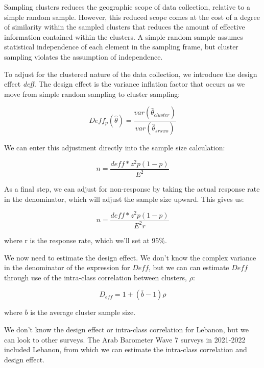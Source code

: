\documentclass[
  letterpaper,
  DIV=11,
  numbers=noendperiod]{scrreprt}
\newenvironment{Shaded}{\begin{snugshade}}{\end{snugshade}}
\newcommand{\CommentTok}[1]{\textcolor[rgb]{0.37,0.37,0.37}{#1}}
\newcommand{\FunctionTok}[1]{\textcolor[rgb]{0.28,0.35,0.67}{#1}}
\newcommand{\NormalTok}[1]{\textcolor[rgb]{0.00,0.23,0.31}{#1}}
\newcommand{\OtherTok}[1]{\textcolor[rgb]{0.00,0.23,0.31}{#1}}
\newcommand{\SpecialCharTok}[1]{\textcolor[rgb]{0.37,0.37,0.37}{#1}}
\begin{document}
Sampling clusters reduces the geographic scope of data collection,
relative to a simple random sample. However, this reduced scope comes at
the cost of a degree of similarity within the sampled clusters that
reduces the amount of effective information contained within the
clusters. A simple random sample assumes statistical independence of
each element in the sampling frame, but cluster sampling violates the
assumption of independence.

To adjust for the clustered nature of the data collection, we introduce
the design effect \emph{deff}. The design effect is the variance
inflation factor that occurs as we move from simple random sampling to
cluster sampling:

\[
Deff_p(\hat\theta)=\frac{var(\hat\theta_{cluster})}{var(\hat\theta_{srswo})}
\]

We can enter this adjustment directly into the sample size calculation:

\[
n=\frac{deff*z^2p(1-p)}{E^2}
\]

As a final step, we can adjust for non-response by taking the actual
response rate in the denominator, which will adjust the sample size
upward. This gives us:

\[
n=\frac{deff*z^2p(1-p)}{E^2r}
\]

where r is the response rate, which we'll set at 95\%.

We now need to estimate the design effect. We don't know the complex
variance in the denominator of the expression for \(Deff\), but we can
can estimate \(Deff\) through use of the intra-class correlation between
clusters, \(\rho\):

\[
D_{eff}=1+(\bar{b}-1)\rho
\]

where \(\bar{b}\) is the average cluster sample size.

We don't know the design effect or intra-class correlation for Lebanon,
but we can look to other surveys. The Arab Barometer Wave 7 surveys in
2021-2022 included Lebanon, from which we can estimate the intra-class
correlation and design effect.

\begin{Shaded}
\end{Shaded}
\end{document}

